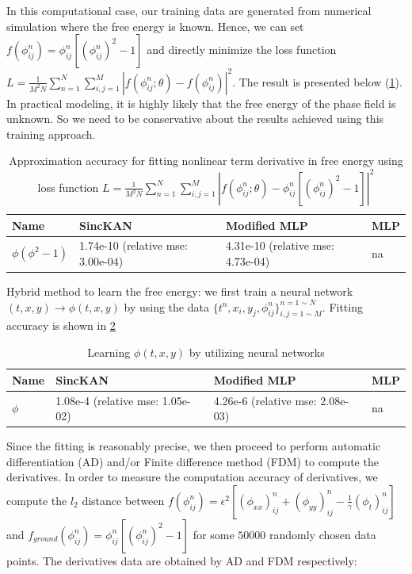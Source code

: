 In this computational case, our training data are generated from numerical simulation where the free energy is known. Hence, we can set \( f( \phi^{n}_{ij} ) =  \phi^{n}_{ij} [(\phi^{n}_{ij})^{2} - 1] \) and directly minimize the loss function \( L = \frac{1}{M^{2}N} \sum^{N}_{n=1} \sum^{M}_{i,j=1} |f( \phi^{n}_{ij};\theta ) - f( \phi^{n}_{ij} )|^2 \). The result is presented below (\cref{tab:free energy derivative3}). In practical modeling, it is highly likely that the free energy of the phase field is unknown. So we need to be conservative about the results achieved using this training approach.
\begin{table}[H]
    \centering
    \begin{tabular}{|l|l|l|l|}
         \hline Name&  SincKAN&  Modified MLP& MLP\\
         \hline $\phi ( \phi^2 - 1)$ &  1.74e-10 (relative mse: 3.00e-04)&  4.31e-10 (relative mse: 4.73e-04)& na\\
         \hline
    \end{tabular}
    \caption{Approximation accuracy for fitting nonlinear term derivative in free energy using loss function \( L = \frac{1}{M^{2}N} \sum^{N}_{n=1} \sum^{M}_{i,j=1} |f( \phi^{n}_{ij};\theta ) - \phi^{n}_{ij} [(\phi^{n}_{ij})^{2} - 1]|^2 \)}
    \label{tab:free energy derivative3}
\end{table}

Hybrid method to learn the free energy: we first train a neural network $(t,x,y) \longrightarrow \phi(t,x,y)$ by using the data $\{ t^{n},x_{i},y_{j},\phi^{n}_{ij} \}^{n=1 \sim N}_{i,j=1 \sim M}$. Fitting accuracy is shown in \cref{tab:phitxy1}
\begin{table}[H]
    \centering
    \begin{tabular}{|l|l|l|l|}
         \hline Name&  SincKAN&  Modified MLP& MLP\\
         \hline $\phi$ &  1.08e-4 (relative mse: 1.05e-02)&  4.26e-6 (relative mse: 2.08e-03)& na\\
         \hline
    \end{tabular}
    \caption{Learning $\phi(t,x,y)$ by utilizing neural networks}
    \label{tab:phitxy1}
\end{table}
Since the fitting is reasonably precise, we then proceed to perform automatic differentiation (AD) and/or Finite difference method (FDM) to compute the derivatives. In order to measure the computation accuracy of derivatives, we compute the $l_2$ distance between $f( \phi^{n}_{ij} ) = \epsilon^2 [(\phi_{xx})^{n}_{ij} + (\phi_{yy})^{n}_{ij} - \frac{1}{\gamma} (\phi_t)^{n}_{ij}]$ and \( f_{ground}( \phi^{n}_{ij} ) =  \phi^{n}_{ij} [(\phi^{n}_{ij})^{2} - 1] \) for some $50000$ randomly chosen data points. The derivatives data are obtained by AD and FDM respectively:

